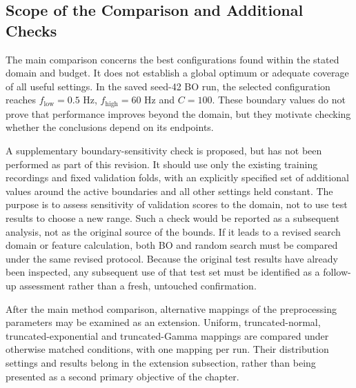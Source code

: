 \subsection{Scope of the Comparison and Additional Checks}
\label{subsec:setup-scope}

The main comparison concerns the best configurations found within the stated
domain and budget. It does not establish a global optimum or adequate
coverage of all useful settings. In the saved seed-42 BO run, the selected
configuration reaches $f_{\mathrm{low}}=0.5$ Hz, $f_{\mathrm{high}}=60$ Hz and
$C=100$. These boundary values do not prove that performance improves beyond
the domain, but they motivate checking whether the conclusions depend on its
endpoints.

A supplementary boundary-sensitivity check is proposed, but has not been
performed as part of this revision. It should use only the existing training
recordings and fixed validation folds, with an explicitly specified set of
additional values around the active boundaries and all other settings held
constant. The purpose is to assess sensitivity of validation scores to the
domain, not to use test results to choose a new range. Such a check would be
reported as a subsequent analysis, not as the original source of the bounds.
If it leads to a revised search domain or feature calculation, both BO and
random search must be compared under the same revised protocol. Because the
original test results have already been inspected, any subsequent use of that
test set must be identified as a follow-up assessment rather than a fresh,
untouched confirmation.

After the main method comparison, alternative mappings of the preprocessing
parameters may be examined as an extension. Uniform, truncated-normal,
truncated-exponential and truncated-Gamma mappings are compared under otherwise
matched conditions, with one mapping per run. Their distribution settings
and results belong in the extension subsection, rather than being presented
as a second primary objective of the chapter.
